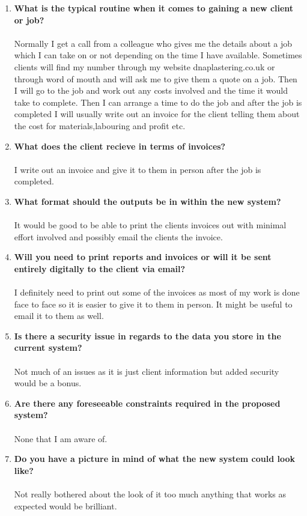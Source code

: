 \begin{enumerate}
	\item \textbf{What is the typical routine when it comes to gaining a new client or job?}
		\\ \\ Normally I get a call from a colleague who gives me the details about a job which I can take on or not depending on the time I have available. Sometimes clients will find my number through my website dnaplastering.co.uk or through word of mouth and will ask me to give them a quote on a job. Then I will go to the job and work out any costs involved and the time it would take to complete. Then I can arrange a time to do the job and after the job is completed I will usually write out an invoice for the client telling them about the cost for materials,labouring and profit etc.
	\item \textbf{What does the client recieve in terms of invoices?}
		\\ \\ I write out an invoice and give it to them in person after the job is completed.
	\item \textbf{What format should the outputs be in within the new system?}
		\\ \\ It would be good to be able to print the clients invoices out with minimal effort involved and possibly email the clients the invoice.
	\item \textbf{Will you need to print reports and invoices or will it be sent entirely digitally to the client via email?}
		\\ \\ I definitely need to print out some of the invoices as most of my work is done face to face so it is easier to give it to them in person. It might be useful to email it to them as well.
	\item \textbf{Is there a security issue in regards to the data you store in the current system?}
		\\ \\ Not much of an issues as it is just client information  but added security would be a bonus.
	\item \textbf{Are there any foreseeable constraints required in the proposed system?}
		\\ \\ None that I am aware of.
	\item \textbf{Do you have a picture in mind of what the new system could look like?}
		\\ \\ Not really bothered about the look of it too much anything that works as expected would be brilliant.
\end{enumerate}


